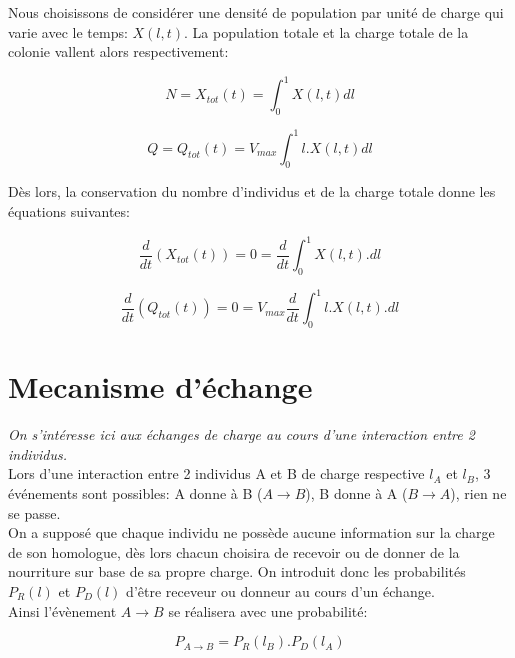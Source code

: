 Nous choisissons de considérer une densité de population par unité de charge qui varie avec le temps: $X(l,t)$.
La population totale et la charge totale de la colonie vallent alors respectivement:

\begin{equation}
N = X_{tot}(t) = \int^1_0X(l,t) dl
\label{Xtot}
\end{equation}

\begin{equation}
Q = Q_{tot}(t) = V_{max} \int^1_0 l.X(l,t) dl
\label{Qtot}
\end{equation}


Dès lors, la conservation du nombre d'individus et de la charge totale donne les équations suivantes:

\begin{equation}
\frac{d}{d t} (X_{tot}(t)) = 0 = \frac{d}{dt}\int^1_0 X(l,t).dl
\label{ConservationXtot}
\end{equation}

\begin{equation}
\frac{d}{d t} (Q_{tot}(t)) = 0 = V_{max} \frac{d}{dt}\int^1_0 l.X(l,t).dl
\label{ConservationQtot}
\end{equation}

\section{Mecanisme d'échange}

\textit{On s'intéresse ici aux échanges de charge au cours d'une interaction entre 2 individus.}\\

Lors d'une interaction entre 2 individus A et B de charge respective $l_A$ et $l_B$, 3 événements sont possibles: A donne à B ($A \rightarrow B$), B donne à A ($B \rightarrow A$), rien ne se passe.\\

On a supposé que chaque individu ne possède aucune information sur la charge de son homologue, dès lors chacun choisira de recevoir ou de donner de la nourriture sur base de sa propre charge. On introduit donc les probabilités $P_R(l)$ et $P_D(l)$ d'être receveur ou donneur au cours d'un échange.\\


Ainsi l'évènement $A \rightarrow B$ se réalisera avec une probabilité:

\begin{equation}
P_{A \rightarrow B} = P_R(l_B) . P_D(l_A)
\label{ProbaAdonneB}
\end{equation}

